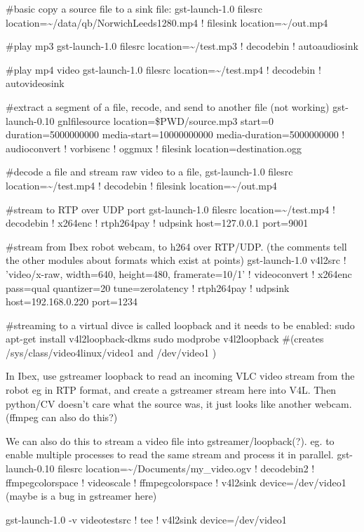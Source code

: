 \documentclass[oneside,english]{scrbook}
\begin{document}
\#basic copy a source file to a sink file: gst-launch-1.0 filesrc
location=\textasciitilde{}/data/qb/NorwichLeeds1280.mp4 ! filesink
location=\textasciitilde{}/out.mp4

\#play mp3 gst-launch-1.0 filesrc location=\textasciitilde{}/test.mp3
! decodebin ! autoaudiosink

\#play mp4 video gst-launch-1.0 filesrc location=\textasciitilde{}/test.mp4
! decodebin ! autovideosink

\#extract a segment of a file, recode, and send to another file (not
working) gst-launch-0.10 gnlfilesource location=\$PWD/source.mp3 start=0
duration=5000000000 media-start=10000000000 media-duration=5000000000
! audioconvert ! vorbisenc ! oggmux ! filesink location=destination.ogg

\#decode a file and stream raw video to a file, gst-launch-1.0 filesrc
location=\textasciitilde{}/test.mp4 ! decodebin ! filesink location=\textasciitilde{}/out.mp4

\#stream to RTP over UDP port gst-launch-1.0 filesrc location=\textasciitilde{}/test.mp4
! decodebin ! x264enc ! rtph264pay ! udpsink host=127.0.0.1 port=9001

\#stream from Ibex robot webcam, to h264 over RTP/UDP. (the comments
tell the other modules about formats which exist at points) gst-launch-1.0
v4l2src ! 'video/x-raw, width=640, height=480, framerate=10/1' ! videoconvert
! x264enc pass=qual quantizer=20 tune=zerolatency ! rtph264pay ! udpsink
host=192.168.0.220 port=1234

\#streaming to a virtual divce is called loopback and it needs to
be enabled: sudo apt-get install v4l2loopback-dkms sudo modprobe v4l2loopback
\#(creates /sys/class/video4linux/video1 and /dev/video1 )

In Ibex, use gstreamer loopback to read an incoming VLC video stream
from the robot eg in RTP format, and create a gstreamer stream here
into V4L. Then python/CV doesn't care what the source was, it just
looks like another webcam. (ffmpeg can also do this?)

We can also do this to stream a video file into gstreamer/loopback(?).
eg. to enable multiple processes to read the same stream and process
it in parallel. gst-launch-0.10 filesrc location=\textasciitilde{}/Documents/my\_video.ogv
! decodebin2 ! ffmpegcolorspace ! videoscale ! ffmpegcolorspace !
v4l2sink device=/dev/video1 (maybe is a bug in gstreamer here)

gst-launch-1.0 -v videotestsrc ! tee ! v4l2sink device=/dev/video1 
\end{document}
